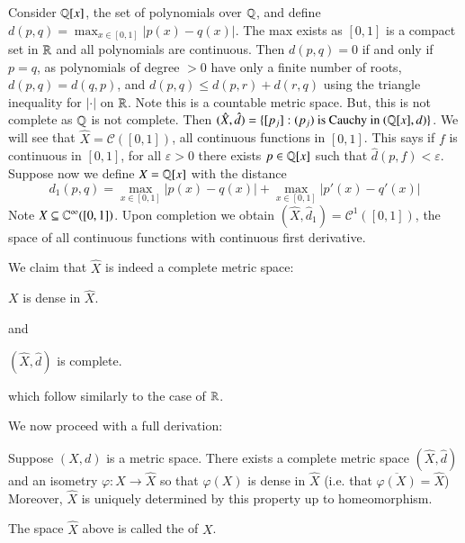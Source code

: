 \begin{example}
    Consider $\mathbb Q[x]$, the set of polynomials over $\mathbb Q$, and define $d(p,q) = \max_{x \in [0,1]}|p(x) - q(x)|$. The max exists as $[0,1]$ is a compact set in $\mathbb R$ and all polynomials are continuous. Then $d(p,q) = 0$ if and only if $p = q$, as polynomials of degree $> 0$ have only a finite number of roots, $d(p,q) = d(q,p)$, and $d(p,q) \leq d(p,r) + d(r,q)$ using the triangle inequality for $|\cdot|$ on $\mathbb R$. Note this is a countable metric space. But, this is not complete as $\mathbb Q$ is not complete. Then $(\hat{X},\hat{d}) = \{[p_j]:(p_j)\text{ is Cauchy in }(\mathbb Q[x],d)\}$. We will see that $\hat{X} = \mathcal{C}([0,1])$, all continuous functions in $[0,1]$. This says if $f$ is continuous in $[0,1]$, for all $\varepsilon > 0$ there exists $p \in \mathbb Q[x]$ such that $\hat{d}(p,f) < \varepsilon$. Suppose now we define $X = \mathbb Q[x]$ with the distance \begin{equation*}
        d_1(p,q) = \max_{x \in [0,1]}|p(x) - q(x)| + \max_{x \in [0,1]}|p'(x) - q'(x)|
    \end{equation*}
    Note $X \subseteq \mathbb C^{\infty}([0,1])$. Upon completion we obtain $(\hat{X},\hat{d}_1) = \mathcal{C}^1([0,1])$, the space of all continuous functions with continuous first derivative.
\end{example}

We claim that $\hat{X}$ is indeed a complete metric space:

\begin{lemma}
    $X$ is dense in $\hat{X}$.
\end{lemma}
and 
\begin{proposition}
    $(\hat{X},\hat{d})$ is complete.
\end{proposition}
which follow similarly to the case of $\mathbb R$.


We now proceed with a full derivation:

\begin{theorem}
    Suppose $(X,d)$ is a metric space. There exists a complete metric space $(\hat{X},\hat{d})$ and an isometry $\varphi:X\rightarrow \hat{X}$ so that $\varphi(X)$ is dense in $\hat{X}$ (i.e. that $\overline{\varphi(X)} = \hat{X}$) Moreover, $\hat{X}$ is uniquely determined by this property up to homeomorphism.
\end{theorem}

\begin{definition}
    The space $\hat{X}$ above is called the  of $X$.
\end{definition}

